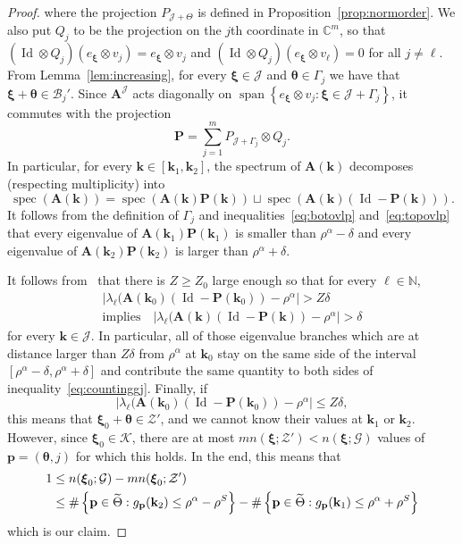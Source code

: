 \documentclass[10pt]{amsart}
\theoremstyle{definition}\newtheorem{defi}[theo]{Definition}\newtheorem{rema}[theo]{Remark}\newtheorem{exam}[theo]{Example}\newtheorem{nota}[theo]{Notation}
\DeclareMathOperator{\spann}{span}
\DeclareMathOperator{\spec}{spec}
\DeclareMathOperator{\Id}{Id}
\newcommand{\C}{\mathbb C}
\newcommand{\N}{\mathbb N}
\newcommand{\CB}{\mathcal{B}}
\newcommand{\CG}{\mathcal{G}}
\newcommand{\CJ}{\mathcal{J}}
\newcommand{\CK}{\mathcal{K}}
\newcommand{\CZ}{\mathcal{Z}}
\newcommand{\btheta}{\boldsymbol \theta}
\newcommand{\bxi}{\boldsymbol \xi}
\newcommand{\BA}{\mathbf A}
\newcommand{\BP}{\mathbf P}
\newcommand{\bk}{\mathbf k}
\newcommand{\bp}{\mathbf p}
\newcommand{\abs}[1]{\left\lvert #1 \right\rvert}
\newcommand{\set}[1]{\left\{ #1 \right\}}
\let\oldtilde\tilde
\renewcommand*{\tilde}[1]{\mathchoice{\widetilde{#1}}{\widetilde{#1}}{\oldtilde{#1}}{\oldtilde{#1}}}
\begin{document}
\begin{proof}
where the projection $P_{\CJ + \Theta}$ is defined in Proposition~\ref{prop:normorder}. We also put $Q_j$ to be the projection on the $j$th coordinate in $\C^m$, so that $(\Id \otimes Q_j)(e_{\bxi}\otimes v_j) = e_{\bxi} \otimes v_j$ and $(\Id \otimes Q_j)(e_{\bxi} \otimes v_\ell) = 0$ for all $j \ne \ell$. From Lemma~\ref{lem:increasing}, for every $\bxi \in \CJ$ and $\btheta \in \Gamma_j$ we have that $\bxi + \btheta \in \CB_j'$. Since $\BA^\CJ$ acts diagonally on $\spann\set{e_{\bxi} \otimes v_j : \bxi \in \CJ +
\Gamma_j}$, it commutes with the projection
\begin{equation}
\BP = \sum_{j=1}^m P_{\CJ + \Gamma_j} \otimes Q_j.
\end{equation}
In particular, for every $\bk \in [\bk_1,\bk_2]$, the spectrum of $\BA(\bk)$ decomposes (respecting multiplicity) into
\begin{equation}
\spec(\BA(\bk)) = \spec(\BA(\bk) \BP(\bk)) \sqcup \spec(\BA(\bk) (\Id -
\BP(\bk))).
\end{equation}
It follows from the definition of $\Gamma_j$ and inequalities~\eqref{eq:botovlp} and~\eqref{eq:topovlp} that every eigenvalue of $\BA(\bk_1) \BP(\bk_1)$ is smaller than $\rho^\alpha - \delta$ and every eigenvalue of $\BA(\bk_2)
\BP(\bk_2)$ is larger than $\rho^\alpha + \delta$.

It follows from~\cite[Theorem~3.6]{ParSob2010} that there is $Z \ge Z_0$ large enough so that for every $\ell \in \N$,
\begin{multline}
\abs{\lambda_\ell(\BA(\bk_0) (\Id - \BP(\bk_0)) - \rho^\alpha } > Z
\delta \\
\text{implies} \quad
\abs{\lambda_\ell(\BA(\bk) (\Id - \BP(\bk)) - \rho^\alpha } >
\delta
\end{multline}
for every $\bk \in \CJ$. In particular, all of those eigenvalue branches which are at distance larger than $Z\delta$ from $\rho^\alpha$ at $\bk_0$ stay on the same side of the interval $[\rho^\alpha - \delta, \rho^\alpha + \delta]$ and contribute the same quantity to both sides of inequality~\eqref{eq:countinggj}. Finally, if
\begin{equation}
\abs{\lambda_\ell(\BA(\bk_0) (\Id - \BP(\bk_0)) - \rho^\alpha } \le Z
\delta,
\end{equation}
this means that $\bxi_0 + \btheta \in \CZ'$, and we cannot know their values at $\bk_1$ or $\bk_2$. However, since $\bxi_0 \in \CK$, there are at most $m n(\bxi;\CZ') < n(\bxi;\CG)$ values of $\bp = (\btheta,j)$ for which this holds. In the end, this means that
\begin{equation}
\begin{aligned}
1 &\le n(\bxi_0;\CG) - m n(\bxi_0;\CZ') \\&\le
\#\set{\bp \in \tilde \Theta : g_\bp(\bk_2) \le \rho^\alpha - \rho^S } -
\#\set{\bp \in \tilde \Theta : g_\bp(\bk_1) \le \rho^\alpha + \rho^S}
\end{aligned}
\end{equation}
which is our claim.
\end{proof}
\end{document}
